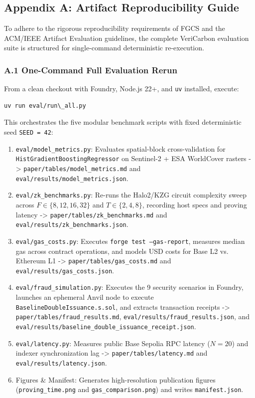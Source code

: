 \documentclass[preprint,12pt]{elsarticle}
\begin{document}
\appendix

\subsection{Appendix A: Artifact Reproducibility Guide}

To adhere to the rigorous reproducibility requirements of FGCS and the ACM/IEEE Artifact Evaluation guidelines, the complete VeriCarbon evaluation suite is structured for single-command deterministic re-execution.

\subsubsection{A.1 One-Command Full Evaluation Rerun}
From a clean checkout with Foundry, Node.js 22+, and \texttt{uv} installed, execute:
\begin{verbatim}
uv run eval/run\_all.py
\end{verbatim}
This orchestrates the five modular benchmark scripts with fixed deterministic seed \texttt{SEED = 42}:
\begin{enumerate}
\item \texttt{eval/model\_metrics.py}: Evaluates spatial-block cross-validation for \texttt{HistGradientBoostingRegressor} on Sentinel-2 + ESA WorldCover rasters -> \texttt{paper/tables/model\_metrics.md} and \texttt{eval/results/model\_metrics.json}.
\item \texttt{eval/zk\_benchmarks.py}: Re-runs the Halo2/KZG circuit complexity sweep across $F \in \{8, 12, 16, 32\}$ and $T \in \{2, 4, 8\}$, recording host specs and proving latency -> \texttt{paper/tables/zk\_benchmarks.md} and \texttt{eval/results/zk\_benchmarks.json}.
\item \texttt{eval/gas\_costs.py}: Executes \texttt{forge test --gas-report}, measures median gas across contract operations, and models USD costs for Base L2 vs. Ethereum L1 -> \texttt{paper/tables/gas\_costs.md} and \texttt{eval/results/gas\_costs.json}.
\item \texttt{eval/fraud\_simulation.py}: Executes the 9 security scenarios in Foundry, launches an ephemeral Anvil node to execute \texttt{BaselineDoubleIssuance.s.sol}, and extracts transaction receipts -> \texttt{paper/tables/fraud\_results.md}, \texttt{eval/results/fraud\_results.json}, and \texttt{eval/results/baseline\_double\_issuance\_receipt.json}.
\item \texttt{eval/latency.py}: Measures public Base Sepolia RPC latency ($N=20$) and indexer synchronization lag -> \texttt{paper/tables/latency.md} and \texttt{eval/results/latency.json}.
\item Figures \& Manifest: Generates high-resolution publication figures (\texttt{proving\_time.png} and \texttt{gas\_comparison.png}) and writes \texttt{manifest.json}.
\end{enumerate}
\end{document}
